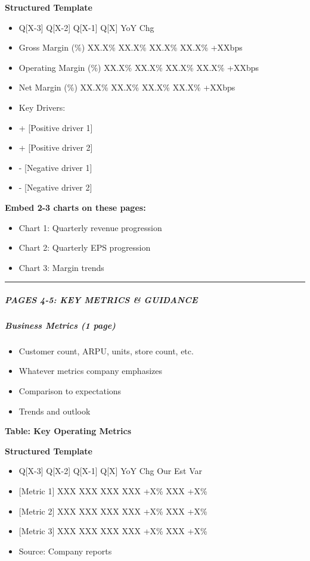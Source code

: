 \documentclass[11pt]{article}
\begin{document}
\textbf{Structured Template}
\begin{itemize}[leftmargin=*,itemsep=2pt,topsep=2pt]
\item {} Q[X-3] Q[X-2] Q[X-1] Q[X] YoY Chg
\item {} Gross Margin (\%) XX.X\% XX.X\% XX.X\% XX.X\% +XXbps
\item {} Operating Margin (\%) XX.X\% XX.X\% XX.X\% XX.X\% +XXbps
\item {} Net Margin (\%) XX.X\% XX.X\% XX.X\% XX.X\% +XXbps
\item {} Key Drivers:
\item {} + [Positive driver 1]
\item {} + [Positive driver 2]
\item {} - [Negative driver 1]
\item {} - [Negative driver 2]
\end{itemize}

\textbf{Embed 2-3 charts on these pages:}

\begin{itemize}[leftmargin=*,itemsep=2pt,topsep=2pt]
\item {} Chart 1: Quarterly revenue progression
\item {} Chart 2: Quarterly EPS progression
\item {} Chart 3: Margin trends
\end{itemize}

\vspace{0.5em}\hrule\vspace{0.5em}

\subparagraph{PAGES 4-5: KEY METRICS \& GUIDANCE}\mbox{}\par

\subparagraph{Business Metrics (1 page)}\mbox{}\par
\begin{itemize}[leftmargin=*,itemsep=2pt,topsep=2pt]
\item {} Customer count, ARPU, units, store count, etc.
\item {} Whatever metrics company emphasizes
\item {} Comparison to expectations
\item {} Trends and outlook
\end{itemize}

\textbf{Table: Key Operating Metrics}

\textbf{Structured Template}
\begin{itemize}[leftmargin=*,itemsep=2pt,topsep=2pt]
\item {} Q[X-3] Q[X-2] Q[X-1] Q[X] YoY Chg Our Est Var
\item {} [Metric 1] XXX XXX XXX XXX +X\% XXX +X\%
\item {} [Metric 2] XXX XXX XXX XXX +X\% XXX +X\%
\item {} [Metric 3] XXX XXX XXX XXX +X\% XXX +X\%
\item {} Source: Company reports
\end{itemize}
\end{document}
